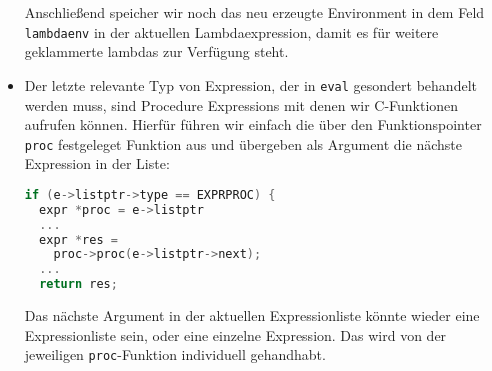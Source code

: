 \begin{itemize}
    Anschließend speicher wir noch das neu erzeugte Environment in dem Feld
    \texttt{lambdaenv} in der aktuellen Lambdaexpression, damit es für weitere
    geklammerte lambdas zur Verfügung steht.
  \item Der letzte relevante Typ von Expression, der in \texttt{eval} 
    gesondert behandelt werden muss, sind Procedure Expressions mit denen
    wir C-Funktionen aufrufen können. Hierfür führen wir einfach die über den
    Funktionspointer \texttt{proc} festgeleget Funktion aus und übergeben als
    Argument die nächste Expression in der Liste:
\begin{lstlisting}[language=C]
if (e->listptr->type == EXPRPROC) {
  expr *proc = e->listptr
  ...
  expr *res = 
    proc->proc(e->listptr->next);
  ...
  return res;
\end{lstlisting}
    Das nächste Argument in der aktuellen Expressionliste könnte wieder eine
    Expressionliste sein, oder eine einzelne Expression. Das wird von der
    jeweiligen \texttt{proc}-Funktion individuell gehandhabt.
\end{itemize}

